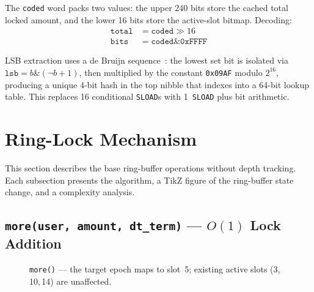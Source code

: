 \documentclass[10pt,a4paper,twocolumn]{article}
\theoremstyle{definition}
\theoremstyle{plain}
\theoremstyle{remark}
\begin{document}
The \texttt{coded} word packs two values: the upper 240 bits store the cached total locked amount, and the lower 16 bits store the active-slot bitmap. Decoding:
\begin{align}
\texttt{total} &= \texttt{coded} \gg 16 \label{eq:decode-total} \\
\texttt{bits} &= \texttt{coded} \mathbin{\&} \texttt{0xFFFF} \label{eq:decode-bits}
\end{align}

LSB extraction uses a de Bruijn sequence~\cite{debruijn}: the lowest set bit is isolated via $\texttt{lsb} = b \mathbin{\&} (\lnot b + 1)$, then multiplied by the constant \texttt{0x09AF} modulo $2^{16}$, producing a unique 4-bit hash in the top nibble that indexes into a 64-bit lookup table. This replaces 16 conditional \texttt{SLOAD}s with 1~\texttt{SLOAD} plus bit arithmetic.

\section{Ring-Lock Mechanism}
\label{sec:ringlock}

This section describes the base ring-buffer operations without depth tracking. Each subsection presents the algorithm, a TikZ figure of the ring-buffer state change, and a complexity analysis.

\subsection{\texttt{more(user, amount, dt\_term)} --- $O(1)$ Lock Addition}
\label{subsec:more}

\begin{figure}[htbp]
\centering
{}
\caption{\texttt{more()} --- the target epoch maps to slot~5; existing active slots (3,\,10,\,14) are unaffected.}
\label{fig:more}
\end{figure}
\end{document}
